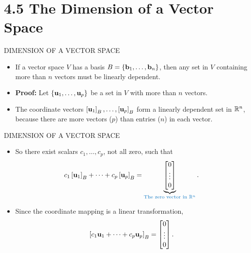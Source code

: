\section[4.5 Dimension]{4.5 The Dimension of a Vector Space}

\begin{frame}[shrink=8]{DIMENSION OF A VECTOR SPACE}
\begin{itemize}
\item {} If a vector space $V$ has a basis $B=\{\mathbf{b}_1,\ldots,\mathbf{b}_n\}$, then any set in $V$ containing more than $n$ vectors must be linearly dependent.
\item \textbf{Proof:} Let $\{\mathbf{u}_1,\ldots,\mathbf{u}_p\}$ be a set in $V$ with more than $n$ vectors.
\item The coordinate vectors $\left[\mathbf{u}_1\right]_{B},\ldots,\left[\mathbf{u}_p\right]_{B}$ form a linearly dependent set in $\mathbb{R}^n$, because there are more vectors ($p$) than entries ($n$) in each vector.
\end{itemize}
\end{frame}

\begin{frame}[shrink=8]{DIMENSION OF A VECTOR SPACE}
\begin{itemize}
\item So there exist scalars $c_1,\ldots,c_p$, not all zero, such that
\[
c_1\coord{\vect u_1}{B}+\cdots+c_p\coord{\vect u_p}{B}
=\underbrace{\begin{bmatrix}0\\\vdots\\0\end{bmatrix}}_{\textcolor{sourceblue}{\text{The zero vector in }\R^n}}.
\]
\item Since the coordinate mapping is a linear transformation,
\[
\left[c_1\mathbf{u}_1+\cdots+c_p\mathbf{u}_p\right]_{B}
=\begin{bmatrix}0\\\vdots\\0\end{bmatrix}.
\]
\end{itemize}
\end{frame}

